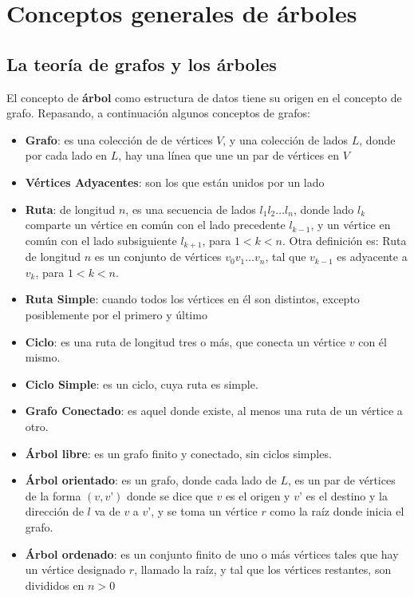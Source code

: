 \section{ Conceptos generales de árboles }
\subsection{La teoría de grafos y los árboles}
El concepto de \textbf{árbol} como estructura de datos tiene su origen en el
concepto de grafo.  Repasando, a continuación algunos conceptos de
grafos:

\begin{itemize}
\item \textbf{Grafo}: es una colección de de vértices $V$, y una
  colección de lados $L$, donde por cada lado en $L$, hay una línea
  que une un par de vértices en $V$
\item \textbf{Vértices Adyacentes}: son los que están unidos por un
  lado
\item \textbf{Ruta}: de longitud $n$, es una secuencia de lados $l_1
  l_2 \dotso l_n$, donde lado $l_k$ comparte un vértice en común con
  el lado precedente $l_{k-1}$, y un vértice en común con el lado
  subsiguiente $l_{k+1}$, para $1 < k < n$. Otra definición es: Ruta
  de longitud $n$ es un conjunto de vértices $v_0v_1 \ldots v_n$, tal
  que $v_{k-1}$ es adyacente a $v_k$, para $1 < k < n$.
\item \textbf{Ruta Simple}: cuando todos los vértices en él son
  distintos, excepto posiblemente por el primero y último
\item \textbf{Ciclo}: es una ruta de longitud tres o más, que conecta
  un vértice $v$ con él mismo.
\item \textbf{Ciclo Simple}: es un ciclo, cuya ruta es simple.
\item \textbf{Grafo Conectado}: es aquel donde existe, al menos una
  ruta de un vértice a otro.
\item \textbf{Árbol libre}: es un grafo finito y conectado, sin ciclos
  simples.
\item \textbf{Árbol orientado}: es un grafo, donde cada lado de $L$,
  es un par de vértices de la forma $(v, v’)$ donde se dice que $v$ es
  el origen y $v’$ es el destino y la dirección de $l$ va de $v$ a
  $v’$, y se toma un vértice $r$ como la raíz donde inicia el grafo.
\item \textbf{Árbol ordenado}: es un conjunto finito de uno o más
  vértices tales que hay un vértice designado $r$, llamado la raíz, y
  tal que los vértices restantes, son divididos en $n > 0$

\end{itemize}
